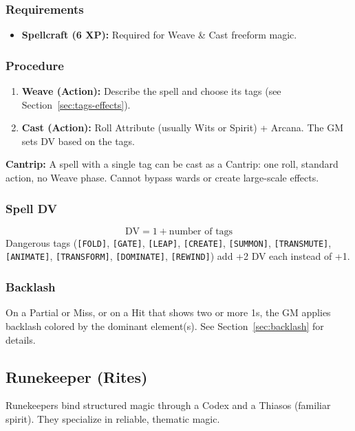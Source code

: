 \subsubsection{Requirements}
\begin{itemize}
  \item \textbf{Spellcraft (6 XP):} Required for Weave \& Cast freeform magic.
\end{itemize}

\subsubsection{Procedure}
\begin{enumerate}
  \item \textbf{Weave (Action):} Describe the spell and choose its tags (see Section~\ref{sec:tags-effects}).
  \item \textbf{Cast (Action):} Roll Attribute (usually Wits or Spirit) + Arcana. The GM sets DV based on the tags.
\end{enumerate}

\textbf{Cantrip:} A spell with a single tag can be cast as a Cantrip: one roll, standard action, no Weave phase. Cannot bypass wards or create large-scale effects.

\subsubsection{Spell DV}
\[
\text{DV} = 1 + \text{number of tags}
\]
Dangerous tags (\texttt{[FOLD]}, \texttt{[GATE]}, \texttt{[LEAP]}, \texttt{[CREATE]}, \texttt{[SUMMON]}, \texttt{[TRANSMUTE]}, \texttt{[ANIMATE]}, \texttt{[TRANSFORM]}, \texttt{[DOMINATE]}, \texttt{[REWIND]}) add +2 DV each instead of +1.

\subsubsection{Backlash}
On a Partial or Miss, or on a Hit that shows two or more 1s, the GM applies backlash colored by the dominant element(s). See Section~\ref{sec:backlash} for details.

\subsection{Runekeeper (Rites)}

Runekeepers bind structured magic through a Codex and a Thiasos (familiar spirit). They specialize in reliable, thematic magic.

